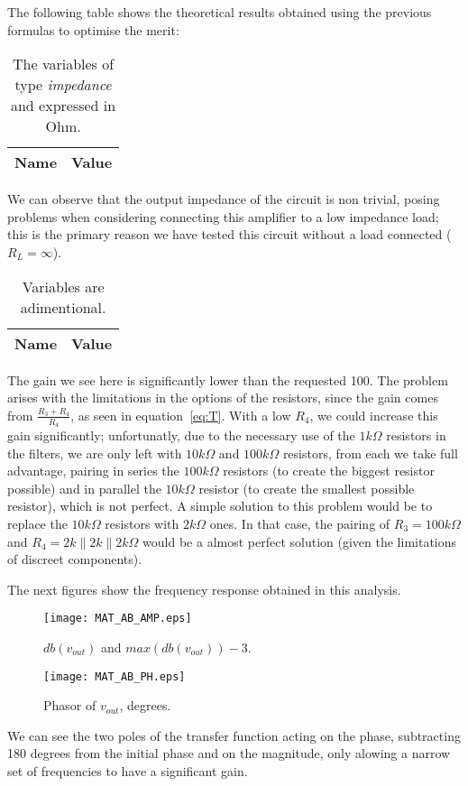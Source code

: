The following table shows the theoretical results obtained using the previous formulas to optimise the merit: 

\begin{table}[h]
  \centering
  \begin{tabular}{|l|r|}
    \hline    
    {\bf Name} & {\bf Value} \\ \hline
    
  \end{tabular}
  \caption{The variables of type {\it impedance} and expressed in Ohm.}
  \label{tab:TEO_IMP}
\end{table}

We can observe that the output impedance of the circuit is non trivial, posing problems when considering connecting this amplifier to a low impedance load; this is the primary reason we have tested this circuit without a load connected ($R_L = \infty$).

\begin{table}[h]
  \centering
  \begin{tabular}{|l|r|}
    \hline    
    {\bf Name} & {\bf Value} \\ \hline
    
  \end{tabular}
  \caption{Variables are adimentional.}
  \label{tab:TEO_RES}
\end{table}

The gain we see here is significantly lower than the requested 100. The problem arises with the limitations in the options of the resistors, since the gain comes from $\frac{R_3+R_4}{R_4}$, as seen in equation~\ref{eq:T}. With a low $R_4$, we could increase this gain significantly; unfortunatly, due to the necessary use of the $1k \Omega$ resistors in the filters, we are only left with $10k \Omega$ and $100k \Omega$ resistors, from each we take full advantage, pairing in series the $100k \Omega$ resistors (to create the biggest resistor possible) and in parallel the $10k \Omega$ resistor (to create the smallest possible resistor), which is not perfect. A simple solution to this problem would be to replace the $10k \Omega$ resistors with $2k \Omega$ ones. In that case, the pairing of $R_3=100k \Omega$ and $R_4=2k \parallel 2k \parallel 2k \Omega$ would be a almost perfect solution (given the limitations of discreet components).

The next figures show the frequency response obtained in this analysis. 

\begin{figure}[h] \centering
	\vspace{-0.3cm}
	\texttt{[image: MAT\_AB\_AMP.eps]}
	\caption{$db(v_{out})$ and $max(db(v_{out}))-3$.}
	\vspace{-0.1cm}
\end{figure}
\begin{figure}[h] \centering
	\vspace{-0.7cm}
	\texttt{[image: MAT\_AB\_PH.eps]}
	\vspace{-0.1cm}
	\caption{Phasor of $v_{out}$, degrees.}
\end{figure}

We can see the two poles of the transfer function acting on the phase, subtracting 180 degrees from the initial phase and on the magnitude, only alowing a narrow set of frequencies to have a significant gain.